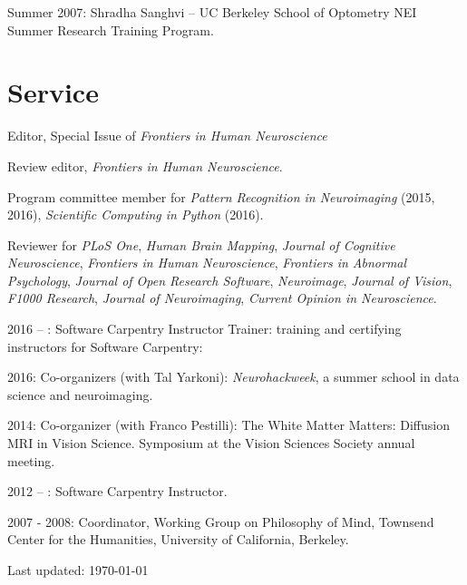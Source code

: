 \documentclass[11pt,fullpage]{article}
\begin{document}
Summer 2007: Shradha Sanghvi -- UC Berkeley School of Optometry NEI Summer Research Training Program.


\section*{Service}

Editor, Special Issue of \emph{Frontiers in Human Neuroscience}

\vspace{1cm}

Review editor, \emph{Frontiers in Human Neuroscience}.

\vspace{1cm}

Program committee member for \emph{Pattern Recognition in Neuroimaging} (2015, 2016), \emph{Scientific Computing in Python} (2016).

\vspace{1cm}

Reviewer for \emph{PLoS One}, \emph{Human Brain Mapping}, \emph{Journal of Cognitive Neuroscience}, \emph{Frontiers in Human Neuroscience}, \emph{Frontiers in Abnormal Psychology}, \emph{Journal of Open Research Software}, \emph{Neuroimage}, \emph{Journal of Vision}, \emph{F1000 Research}, \emph{Journal of Neuroimaging}, \emph{Current Opinion in Neuroscience}.



\vspace{1cm}

2016 -- : Software Carpentry Instructor Trainer: training and certifying instructors for Software Carpentry:

2016: Co-organizers (with Tal Yarkoni): \emph{Neurohackweek}, a summer school in data science and neuroimaging.

2014: Co-organizer (with Franco Pestilli): The White Matter Matters: Diffusion MRI in Vision Science. Symposium at the Vision Sciences Society annual meeting.

2012 -- : Software Carpentry Instructor.

2007 - 2008: Coordinator, Working Group on Philosophy of Mind, Townsend Center for the Humanities, University of California, Berkeley.

\bigskip
\begin{center}
  \begin{footnotesize}
    Last updated: \today
  \end{footnotesize}
\end{center}

\end{document}
